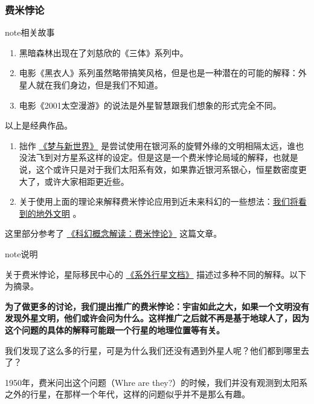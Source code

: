 \documentclass[letterpaper,10pt,english]{sphinxmanual}
\begin{document}
\subsubsection{费米悖论}
\label{physics:id27}
\begin{notice}{note}{相关故事}
\begin{enumerate}
\item {} 
黑暗森林出现在了刘慈欣的《三体》系列中。

\item {} 
电影《黑衣人》系列虽然略带搞笑风格，但是也是一种潜在的可能的解释：外星人就在我们身边，但是我们不知道。

\item {} 
电影《2001太空漫游》的说法是外星智慧跟我们想象的形式完全不同。

\end{enumerate}

以上是经典作品。
\begin{enumerate}
\item {} 
拙作 \href{http://multiverse.lamost.org/blog/6455}{《梦与新世界》} 是尝试使用在银河系的旋臂外缘的文明相隔太远，谁也没法飞到对方星系这样的设定。但是这是一个费米悖论局域的解释，也就是说，这个或许只是对于我们太阳系有效，如果靠近银河系银心，恒星数密度更大了，或许大家相距更近些。

\item {} 
关于使用上面的理论来解释费米悖论应用到近未来科幻的一些想法：\href{http://www.guokr.com/blog/793766/}{我们将看到的地外文明} 。

\end{enumerate}

这里部分参考了 \href{http://www.guokr.com/article/283356/}{《科幻概念解读：费米悖论》} 这篇文章。
\end{notice}

\begin{notice}{note}{说明}

关于费米悖论，星际移民中心的 \href{http://interimm.org/exoplanets}{《系外行星文档》} 描述过多种不同的解释。以下为摘录。

\textbf{为了做更多的讨论，我们提出推广的费米悖论：宇宙如此之大，如果一个文明没有发现外星文明，他们或许会问为什么。这样推广之后就不再是基于地球人了，因为这个问题的具体的解释可能跟一个行星的地理位置等有关。}
\end{notice}

我们发现了这么多的行星，可是为什么我们还没有遇到外星人呢？他们都到哪里去了？

1950年，费米问出这个问题（Whre are they?）的时候，我们并没有观测到太阳系之外的行星，在那样一个年代，这样的问题似乎并不是那么有趣。
\end{document}
